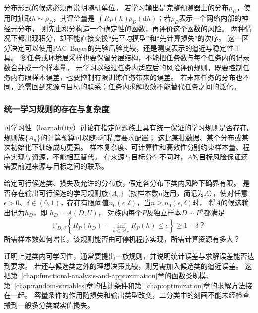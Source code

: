 分布形式的候选必须再说明随机单位。
若学习输出是完整预测器上的分布$\rho_D$，使用时抽取$h\sim\rho_D$，其评价量是
$\int R_P(h)\rho_D(\mathrm dh)$；若$\rho_D$表示一个网络内部的神经元分布，
则先由积分构造一个确定性的函数，再评价这个函数的风险。
两种情况下都出现积分，却不能直接交换“先平均模型”和“先计算损失”的次序。
这一区分决定可以使用PAC--Bayes的先验后验比较，还是测度表示的逼近与稳定性工具。
多任务或环境层采样也要保留分层结构，不能把任务数与每个任务内的记录数合并成一个样本量。
元学习以经过任务内适应后的风险评价规则，既要控制任务内有限样本误差，也要控制有限训练任务带来的误差。
若未来任务的分布也不同，还需回到来源与目标的联系；任务内求解收敛不能替代任务之间的泛化。

\subsubsection{统一学习规则的存在与复杂度}
\label{sec:future-analysis-learnability}

可学习性（learnability）讨论在指定问题族上具有统一保证的学习规则是否存在。
规则族$\{A_n\}$的计算预算可以随$n$和精度要求配置；
这比某批数据、某个分布或某次初始化下训练成功更强。
样本复杂度、可计算性和高效性分别约束样本量、程序实现与资源，不能相互替代。
在来源与目标分布不同时，$A$的目标风险保证还需要前述来源与目标之间的联系。

\begin{mathproblem}[具有统一保证的学习规则是否存在]
  \label{question:future-learnability}
  给定可行候选类、损失及允许的分布族，假定各分布下类内风险下确界有限。
  是否存在输出可行候选的学习规则族$\{A_n\}$（按样本数$n$选用，简记为$A$），使对任意
  $\epsilon>0$、$\delta\in(0,1)$，存在有限阈值$n_0(\epsilon,\delta)$，当$n\geq n_0(\epsilon,\delta)$时，
  将$A$的候选输出记为$h_D$，即
  $h_D=A(D,U)$，
  对族内每个$P$及独立样本$D\sim P^n$都满足
  \[
    \mathbb P_{D,U}\!\left\{
      R_P(h_D)-\inf_{h\in\mathcal H_{\mathcal C}}R_P(h)
      \leq\epsilon
    \right\}\geq1-\delta\text{？}
  \]
  所需样本数如何增长，该规则能否由可停机程序实现，所需计算资源有多大？
\end{mathproblem}

证明上述类内可学习性，通常要提出一族规则，并说明统计误差与求解误差能否达到要求。
若还与候选类之外的理想决策比较，则另需加入候选类的逼近误差。
这把第~\ref{chap:functional-analysis-and-approximation}章的函数类规模、
第~\ref{chap:random-variables}章的估计条件和第~\ref{chap:optimization}章的求解方法接在一起。
容量条件的作用随损失和输出类型改变，二分类中的刻画不能未经检查搬到一般多分类或实值损失。

